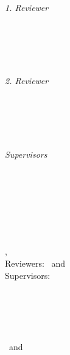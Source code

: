 \begin{titlepage}
	\vfill
	\begin{minipage}[t]{.27\textwidth}
		\raggedleft
		\textit{1. Reviewer}
	\end{minipage}
	\hspace*{15pt}
	\begin{minipage}[t]{.65\textwidth}
		{\Large \thesisFirstReviewer} \\
	  	{\small \thesisFirstReviewerDepartment} \\[-1mm]
		{\small \thesisFirstReviewerUniversity}
	\end{minipage} \\[5mm]
	\begin{minipage}[t]{.27\textwidth}
		\raggedleft
		\textit{2. Reviewer}
	\end{minipage}
	\hspace*{15pt}
	\begin{minipage}[t]{.65\textwidth}
		{\Large \thesisSecondReviewer} \\
	  	{\small \thesisSecondReviewerDepartment} \\[-1mm]
		{\small \thesisSecondReviewerUniversity}
	\end{minipage} \\[10mm]
	\begin{minipage}[t]{.27\textwidth}
		\raggedleft
		\textit{Supervisors}
	\end{minipage}
	\hspace*{15pt}
	\begin{minipage}[t]{.65\textwidth}
		\thesisFirstSupervisor\
	\end{minipage} \\[10mm]

	\thesisDate \\

\end{titlepage}


\hfill
\vfill
{
	\small
	\textbf{\thesisName} \\
	\textit{\thesisTitle} \\
	\thesisSubject, \thesisDate \\
	Reviewers: \thesisFirstReviewer\ and \thesisSecondReviewer \\
	Supervisors: \thesisFirstSupervisor\\[1.5em]
	\textbf{\thesisUniversity} \\
	\textit{\thesisUniversityGroup} \\
	\thesisUniversityInstitute \\
	\thesisUniversityDepartment \\
	\thesisUniversityStreetAddress \\
	\thesisUniversityPostalCode\ and \thesisUniversityCity
}
